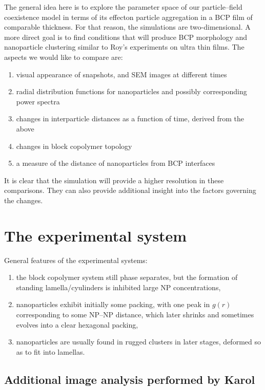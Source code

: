 The general idea here is to explore the parameter space of our particle--field coexistence model\cite{2008-Sevink-Fraaije} in terms of its effecton particle aggregation in a BCP film of comparable thickness. For that reason, the simulations are two-dimensional. A more direct goal is to find conditions that will produce BCP morphology and nanoparticle clustering similar to Roy's experiments on ultra thin films. The aspects we would like to compare are:
\begin{enumerate}
\item visual appearance of snapshots, and SEM images at different times
\item radial distribution functions for nanoparticles and possibly corresponding power spectra
\item changes in interparticle distances as a function of time, derived from the above
\item changes in block copolymer topology
\item a measure of the distance of nanoparticles from BCP interfaces
\end{enumerate}

It is clear that the simulation will provide a higher resolution in these comparisons. They can also provide additional insight into the factors governing the changes.

\section{The experimental system}

General features of the experimental systems:
\begin{enumerate}
\item the block copolymer system still phase separates, but the formation of standing lamella/cyulinders is inhibited large NP concentrations,
\item nanoparticles exhibit initially some packing, with one peak in $g(r)$ corresponding to some NP--NP distance, which later shrinks and sometimes evolves into a clear hexagonal packing,
\item nanoparticles are usually found in rugged clusters in later stages, deformed so as to fit into lamellas.
\end{enumerate}

\subsection{Additional image analysis performed by Karol}

